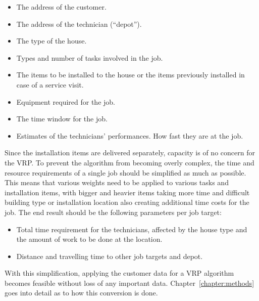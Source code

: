 \begin{itemize}
\item The address of the customer.
\item The address of the technician (``depot'').
\item The type of the house.
\item Types and number of tasks involved in the job.
\item The items to be installed to the house or the items previously installed in case of a service visit.
\item Equipment required for the job.
\item The time window for the job.
\item Estimates of the technicians' performances. How fast they are at the job.
\end{itemize}

Since the installation items are delivered separately, capacity is of no concern for the VRP. To prevent the algorithm from becoming overly complex, the time and resource requirements of a single job should be simplified as much as possible. This means that various weights need to be applied to various tasks and installation items, with bigger and heavier items taking more time and difficult building type or installation location also creating additional time costs for the job. The end result should be the following parameters per job target:

\begin{itemize}
\item Total time requirement for the technicians, affected by the house type and the amount of work to be done at the location.
\item Distance and travelling time to other job targets and depot. 
\end{itemize}

With this simplification, applying the customer data for a VRP algorithm becomes feasible without loss of any important data. Chapter~\ref{chapter:methods} goes into detail as to how this conversion is done.

